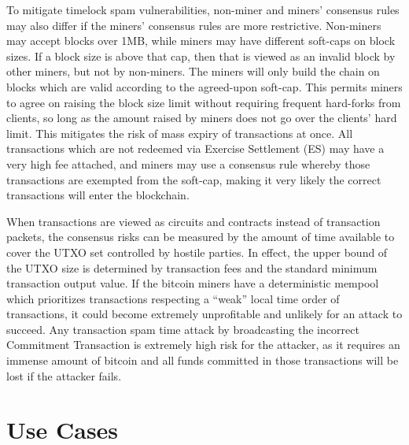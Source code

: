 \documentclass[letterpaper,11pt]{article}
\begin{document}
To mitigate timelock spam vulnerabilities, non-miner and miners' consensus rules
may also differ if the miners' consensus rules are more restrictive. Non-miners
may accept blocks over 1MB, while miners may have different soft-caps on block
sizes. If a block size is above that cap, then that is viewed as an invalid
block by other miners, but not by non-miners. The miners will only build the
chain on blocks which are valid according to the agreed-upon soft-cap. This
permits miners to agree on raising the block size limit without requiring
frequent hard-forks from clients, so long as the amount raised by miners does
not go over the clients' hard limit. This mitigates the risk of mass expiry of
transactions at once. All transactions which are not redeemed via Exercise
Settlement (ES) may have a very high fee attached, and miners may use a
consensus rule whereby those transactions are exempted from the soft-cap, making
it very likely the correct transactions will enter the blockchain.

When transactions are viewed as circuits and contracts instead of transaction
packets, the consensus risks can be measured by the amount of time available to
cover the UTXO set controlled by hostile parties. In effect, the upper bound of
the UTXO size is determined by transaction fees and the standard minimum
transaction output value. If the bitcoin miners have a deterministic mempool
which prioritizes transactions respecting a ``weak'' local time order of
transactions, it could become extremely unprofitable and unlikely for an attack
to succeed. Any transaction spam time attack by broadcasting the incorrect
Commitment Transaction is extremely high risk for the attacker, as it requires
an immense amount of bitcoin and all funds committed in those transactions will
be lost if the attacker fails.

\section{Use Cases}
\end{document}
